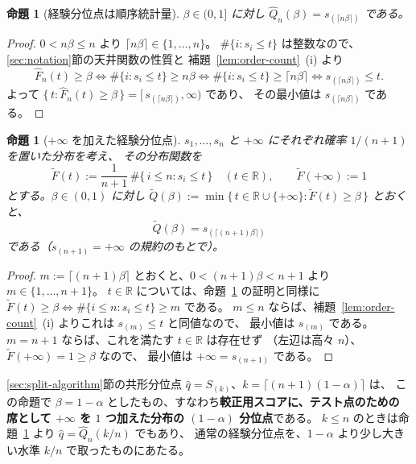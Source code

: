 \documentclass[a4paper,11pt]{jsarticle}
\theoremstyle{definition}
\theoremstyle{plain}
\newtheorem{proposition}[definition]{命題}
\theoremstyle{remark}
\newcommand{\Real}{\mathbb{R}}
\newcommand{\qhat}{\hat{q}}
\begin{document}
\begin{proposition}[経験分位点は順序統計量]
  \label{prop:emp-quantile}
  $\beta\in(0,1]$ に対し $\hat Q_n(\beta)=s_{(\lceil n\beta\rceil)}$ である。
\end{proposition}

\begin{proof}
  $0<n\beta\le n$ より $\lceil n\beta\rceil\in\{1,\dots,n\}$。
  $\#\{i: s_i\le t\}$ は整数なので、\ref{sec:notation}節の天井関数の性質と
  補題~\ref{lem:order-count}~(i) より
  \begin{equation*}
    \hat F_n(t)\ge\beta
    \iff\#\{i: s_i\le t\}\ge n\beta
    \iff\#\{i: s_i\le t\}\ge\lceil n\beta\rceil
    \iff s_{(\lceil n\beta\rceil)}\le t.
  \end{equation*}
  よって $\{\,t:\hat F_n(t)\ge\beta\,\}=[\,s_{(\lceil n\beta\rceil)},\infty)$ であり、
  その最小値は $s_{(\lceil n\beta\rceil)}$ である。
\end{proof}

\begin{proposition}[$+\infty$ を加えた経験分位点]
  \label{prop:aug-quantile}
  $s_1,\dots,s_n$ と $+\infty$ にそれぞれ確率 $1/(n+1)$ を置いた分布を考え、
  その分布関数を
  \begin{equation*}
    \tilde F(t):=\frac{1}{n+1}\,\#\{\,i\le n: s_i\le t\,\}\quad(t\in\Real),\qquad
    \tilde F(+\infty):=1
  \end{equation*}
  とする。$\beta\in(0,1)$ に対し
  $\tilde Q(\beta):=\min\{\,t\in\Real\cup\{+\infty\}:\tilde F(t)\ge\beta\,\}$ とおくと、
  \begin{equation*}
    \tilde Q(\beta)=s_{(\lceil(n+1)\beta\rceil)}
  \end{equation*}
  である（$s_{(n+1)}=+\infty$ の規約のもとで）。
\end{proposition}

\begin{proof}
  $m:=\lceil(n+1)\beta\rceil$ とおくと、$0<(n+1)\beta<n+1$ より $m\in\{1,\dots,n+1\}$。
  $t\in\Real$ については、命題~\ref{prop:emp-quantile} の証明と同様に
  $\tilde F(t)\ge\beta\iff\#\{i\le n: s_i\le t\}\ge m$ である。
  $m\le n$ ならば、補題~\ref{lem:order-count}~(i) よりこれは $s_{(m)}\le t$ と同値なので、
  最小値は $s_{(m)}$ である。$m=n+1$ ならば、これを満たす $t\in\Real$ は存在せず
  （左辺は高々 $n$）、$\tilde F(+\infty)=1\ge\beta$ なので、
  最小値は $+\infty=s_{(n+1)}$ である。
\end{proof}

\ref{sec:split-algorithm}節の共形分位点 $\qhat=S_{(k)}$、$k=\lceil(n+1)(1-\alpha)\rceil$ は、
この命題で $\beta=1-\alpha$ としたもの、すなわち\textbf{較正用スコアに、テスト点のための
席として $+\infty$ を $1$ つ加えた分布の $(1-\alpha)$ 分位点}である。
$k\le n$ のときは命題~\ref{prop:emp-quantile} より $\qhat=\hat Q_n(k/n)$ でもあり、
通常の経験分位点を、$1-\alpha$ より少し大きい水準 $k/n$ で取ったものにあたる。
\end{document}
